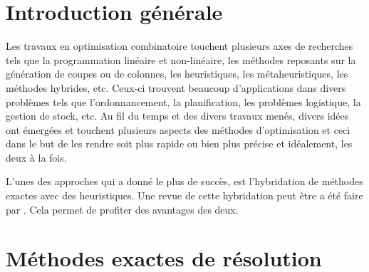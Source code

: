 \documentclass[12pt,a4paper,oneside]{book}
\theoremstyle{definition}
\begin{document}
    

    \listofalgorithms
    \listoffigures
    \tableofcontents
    \newpage
    \chapter*{Introduction générale}
    Les travaux en optimisation combinatoire touchent plusieurs axes de recherches tels que la programmation linéaire et non-linéaire, les méthodes reposants sur la génération de coupes ou de colonnes, les heuristiques, les métaheuristiques, les méthodes hybrides, etc. Ceux-ci trouvent beaucoup d'applications dans divers problèmes tels que l'ordonnancement, la planification, les problèmes logistique, la gestion de stock, etc. Au fil du temps et des divers travaux menés, divers idées ont émergées et touchent plusieurs aspects des méthodes d'optimisation et ceci dans le but de les rendre soit plus rapide ou bien plus précise et idéalement, les deux à la fois.
    
    L'unes des approches qui a donné le plus de succès, est l'hybridation de méthodes exactes avec des heuristiques. Une revue de cette hybridation peut être a été faire par \cite{Puchinger2005}. Cela permet de profiter des avantages des deux.

	\chapter{Méthodes exactes de résolution}
\end{document}
